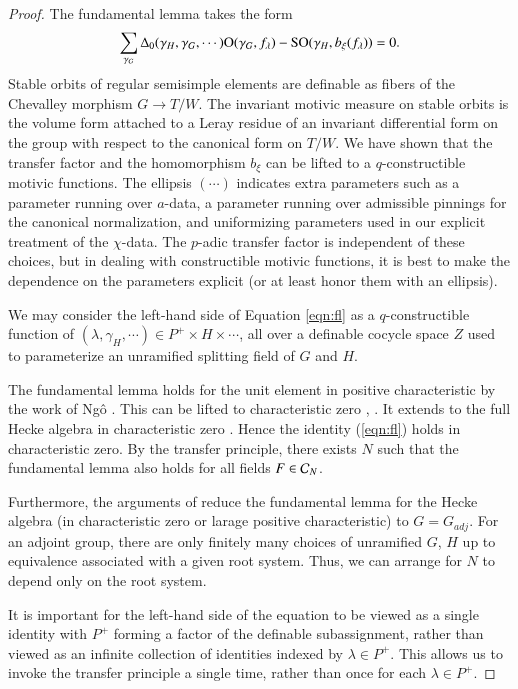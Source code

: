 \begin{proof}
  The fundamental lemma takes the form
\begin{equation}\label{eqn:fl}
\sum_{\gamma_G}\Delta_0(\gamma_H,\gamma_G,\cdots)
{\operatorname{O}}(\gamma_G,f_\lambda) - {\operatorname{SO}}(\gamma_H,b_\xi(f_\lambda)) = 0.
\end{equation}
Stable orbits of regular semisimple elements are definable as fibers
of the Chevalley morphism $G\to T/W$.  The invariant motivic measure
on stable orbits is the volume form attached to a Leray residue of an
invariant differential form on the group with respect to the canonical
form on $T/W$.  We have shown that the transfer factor and the
homomorphism $b_\xi$ can be lifted to a $q$-constructible motivic
functions.  The ellipsis $(\cdots)$ indicates extra parameters such as
a parameter running over $a$-data, a parameter running over admissible
pinnings for the canonical normalization, and uniformizing parameters
used in our explicit treatment of the $\chi$-data.  The $p$-adic
transfer factor is independent of these choices, but in dealing with
constructible motivic functions, it is best to make the dependence on
the parameters explicit (or at least honor them with an ellipsis).

We may consider the left-hand side of Equation \ref{eqn:fl} as a
$q$-constructible function of $(\lambda,\gamma_H,\cdots)\in P^+\times
H\times\cdots$, all over a definable cocycle space $Z$ used to
parameterize an unramified splitting field of $G$ and $H$.

The fundamental lemma holds for the unit element in positive
characteristic by the work of Ng\^o \cite{ngo2010lemme}.  This can be
lifted to characteristic zero \cite{cluckers2011transfer},
\cite{waldspurger2006endoscopie}.  It extends to the full Hecke
algebra in characteristic zero \cite{hales1995fundamental}.  Hence the
identity (\ref{eqn:fl}) holds in characteristic zero.  By the transfer
principle, there exists $N$ such that the fundamental lemma also holds
for all fields $F\in\mathcal C_N$.

Furthermore, the arguments of \cite{hales1995fundamental} reduce the
fundamental lemma for the Hecke algebra (in characteristic zero or
larage positive characteristic) to $G = G_{adj}$.  For an adjoint
group, there are only finitely many choices of unramified $G$, $H$ up
to equivalence associated with a given root system.  Thus, we can
arrange for $N$ to depend only on the root system.

It is important for the left-hand side of the equation to be viewed as
a single identity with $P^+$ forming a factor of the definable
subassignment, rather than viewed as an infinite collection of
identities indexed by $\lambda\in P^+$.  This allows us to invoke the
transfer principle a single time, rather than once for each
$\lambda\in P^+$.
\end{proof}

